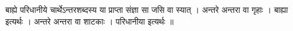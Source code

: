 बाह्ये परिधानीये चार्थेऽन्तरशब्दस्य या प्राप्ता संज्ञा सा जसि वा स्यात्
। अन्तरे अन्तरा वा गृहाः । बाह्या इत्यर्थः । अन्तरे अन्तरा वा शाटकाः ।
परिधानीया इत्यर्थः ॥
